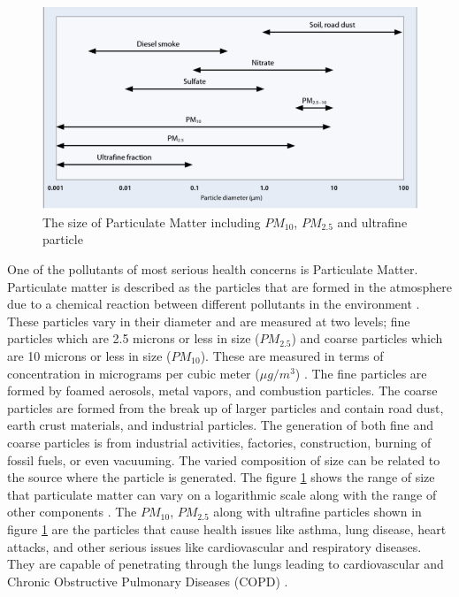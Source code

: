 \hspace{1 cm}

\begin{figure}[h!]
  \begin{center}
  \includegraphics[scale=0.90]{./images/figure37.png}
  \end{center}
 
  \caption{The size of Particulate Matter including $PM_{10}$, $PM_{2.5}$ and ultrafine particle \cite{world2006air}}
  
  \label{PMSIZE}
\end{figure}

\hspace{1 cm}


One of the pollutants of most serious health concerns is Particulate Matter. Particulate matter is described as the particles that are formed in the atmosphere due to a chemical reaction between different pollutants in the environment \cite{manisalidis2020environmental}. These particles vary in their diameter and are measured at two levels; fine particles which are 2.5 microns or less in size ($PM_{2.5}$) and coarse particles which are 10 microns or less in size ($PM_{10}$). These are measured in terms of concentration in micrograms per cubic meter ($\mu g/m^3$) \cite{Wilson1997}. The fine particles are formed by foamed aerosols, metal vapors, and combustion particles. The coarse particles are formed from the break up of larger particles and contain road dust, earth crust materials, and industrial particles. The generation of both fine and coarse particles is from industrial activities, factories, construction, burning of fossil fuels, or even vacuuming. The varied composition of size can be related to the source where the particle is generated. The figure \ref{PMSIZE} shows the range of size that particulate matter can vary on a logarithmic scale along with the range of other components  \cite{world2006air}. The $PM_{10}$, $PM_{2.5}$ along with ultrafine particles shown in figure \ref{PMSIZE} are the particles that cause health issues like asthma, lung disease, heart attacks, and other serious issues like cardiovascular and respiratory diseases. They are capable of penetrating through the lungs leading to cardiovascular and Chronic Obstructive Pulmonary Diseases (COPD) \cite{Tian2016}. 



